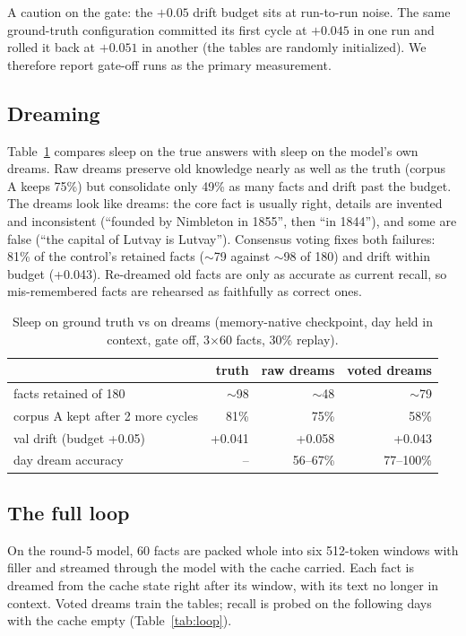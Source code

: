 \documentclass[11pt]{article}
\begin{document}
A caution on the gate: the $+0.05$ drift budget sits at run-to-run noise. The
same ground-truth configuration committed its first cycle at $+0.045$ in one run
and rolled it back at $+0.051$ in another (the tables are randomly
initialized). We therefore report gate-off runs as the primary measurement.

\subsection{Dreaming}
Table~\ref{tab:dream} compares sleep on the true answers with sleep on the
model's own dreams. Raw dreams preserve old knowledge nearly as well as the
truth (corpus A keeps 75\%) but consolidate only 49\% as many facts and drift
past the budget. The dreams look like dreams: the core fact is usually right,
details are invented and inconsistent (``founded by Nimbleton in 1855'', then
``in 1844''), and some are false (``the capital of Lutvay is Lutvay'').
Consensus voting fixes both failures: 81\% of the control's retained facts
($\sim$79 against $\sim$98 of 180) and drift within budget (+0.043). Re-dreamed old facts are only as accurate as current
recall, so mis-remembered facts are rehearsed as faithfully as correct ones.

\begin{table}[t]\centering\small
\caption{Sleep on ground truth vs on dreams (memory-native checkpoint, day held
in context, gate off, 3$\times$60 facts, 30\% replay).}\label{tab:dream}
\begin{tabular}{lrrr}\toprule
& truth & raw dreams & voted dreams\\\midrule
facts retained of 180 & $\sim$98 & $\sim$48 & $\sim$79\\
corpus A kept after 2 more cycles & 81\% & 75\% & 58\%\\
val drift (budget +0.05) & +0.041 & +0.058 & +0.043\\
day dream accuracy & -- & 56--67\% & 77--100\%\\\bottomrule
\end{tabular}\end{table}

\subsection{The full loop}
On the round-5 model, 60 facts are packed whole into six 512-token windows with
filler and streamed through the model with the cache carried. Each fact is
dreamed from the cache state right after its window, with its text no longer in
context. Voted dreams train the tables; recall is probed on the following days
with the cache empty (Table~\ref{tab:loop}).
\end{document}
